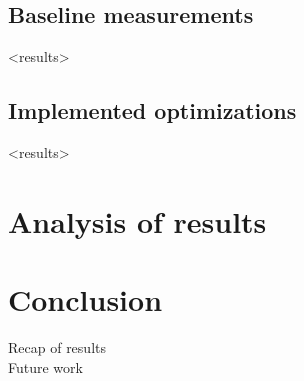 \section{Baseline measurements}
<results>


\section{Implemented optimizations}
<results>

\chapter{Analysis of results}
\label{results}

\chapter{Conclusion}
\label{conclusion}
Recap of results
\\
Future work



